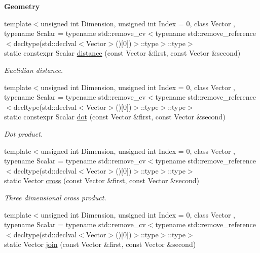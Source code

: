 \begin{Indent}{\bf Geometry}\par
\begin{DoxyCompactItemize}
\item 
{\footnotesize template$<$unsigned int Dimension, unsigned int Index = 0, class Vector , typename Scalar  = typename std\-::remove\-\_\-cv$<$typename std\-::remove\-\_\-reference$<$decltype(std\-::declval$<$\-Vector$>$()\mbox{[}0\mbox{]})$>$\-::type$>$\-::type$>$ }\\static constexpr Scalar \hyperlink{exceptionUtility_a97b7552f884347aa26480b84b65dc37f}{distance} (const Vector \&first, const Vector \&second)
\begin{DoxyCompactList}\small\item\em Euclidian distance. \end{DoxyCompactList}\item 
{\footnotesize template$<$unsigned int Dimension, unsigned int Index = 0, class Vector , typename Scalar  = typename std\-::remove\-\_\-cv$<$typename std\-::remove\-\_\-reference$<$decltype(std\-::declval$<$\-Vector$>$()\mbox{[}0\mbox{]})$>$\-::type$>$\-::type$>$ }\\static constexpr Scalar \hyperlink{exceptionUtility_a2bf5cac446ff15394d9b382b744b5f53}{dot} (const Vector \&first, const Vector \&second)
\begin{DoxyCompactList}\small\item\em Dot product. \end{DoxyCompactList}\item 
{\footnotesize template$<$unsigned int Dimension, unsigned int Index = 0, class Vector , typename Scalar  = typename std\-::remove\-\_\-cv$<$typename std\-::remove\-\_\-reference$<$decltype(std\-::declval$<$\-Vector$>$()\mbox{[}0\mbox{]})$>$\-::type$>$\-::type$>$ }\\static Vector \hyperlink{exceptionUtility_adeee291b41fae8cf2e8aee7260f03b0a}{cross} (const Vector \&first, const Vector \&second)
\begin{DoxyCompactList}\small\item\em Three dimensional cross product. \end{DoxyCompactList}\item 
{\footnotesize template$<$unsigned int Dimension, unsigned int Index = 0, class Vector , typename Scalar  = typename std\-::remove\-\_\-cv$<$typename std\-::remove\-\_\-reference$<$decltype(std\-::declval$<$\-Vector$>$()\mbox{[}0\mbox{]})$>$\-::type$>$\-::type$>$ }\\static Vector \hyperlink{exceptionUtility_a837bb7d580a72127e1ba14bd59c41b54}{join} (const Vector \&first, const Vector \&second)

\end{DoxyCompactItemize}
\end{Indent}
